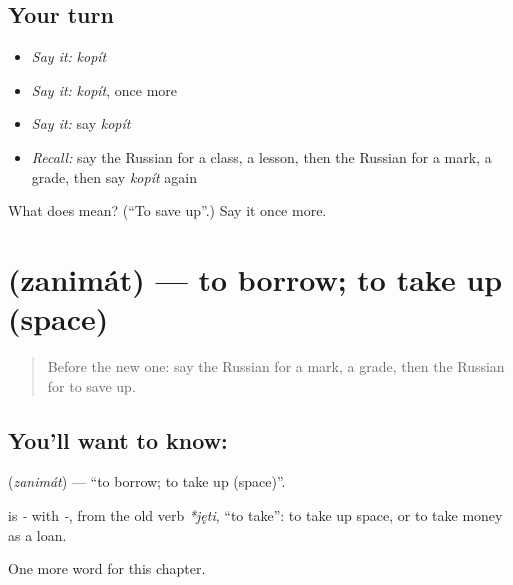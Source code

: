 \subsection*{Your turn}
\begin{itemize}
\raggedright
  \item \emph{Say it:} \emph{kopít}
  \item \emph{Say it:} \emph{kopít}, once more
  \item \emph{Say it:} say \emph{kopít}
  \item \emph{Recall:} say the Russian for a class, a lesson, then the Russian for a mark, a grade, then say \emph{kopít} again
\end{itemize}

\begin{tcolorbox}[breakable,colback=teal!4,colframe=teal!35!black,title={Before you move on}]
What does  mean? (\textquotedblleft{}To save up\textquotedblright{}.) Say it once more.
\end{tcolorbox}
\section[\texorpdfstring{\ru{занимать} (zanimát)}{занимать (zanimát)}]{ (zanimát) — to borrow; to take up (space)}

\label{lesson:RU-C232-zanimat}



\begin{quote}
Before the new one: say the Russian for a mark, a grade, then the Russian for to save up.
\end{quote}

\subsection*{You'll want to know: }
\textbf{} (\emph{zanimát}) — \textquotedblleft{}to borrow; to take up (space)\textquotedblright{}.

\begin{cousinweb}
\textbf{} is \emph{-} with \emph{-}, from the old verb \emph{*jęti}, \textquotedblleft{}to take\textquotedblright{}: to take up space, or to take money as a loan.
\end{cousinweb}

\begin{grammarlens}[title={What you've built}]
One more word for this chapter.
\end{grammarlens}

